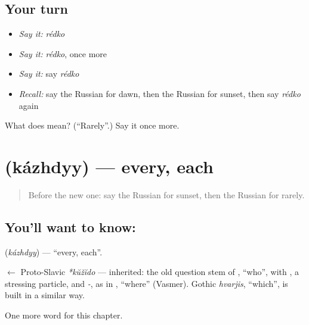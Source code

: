 \subsection*{Your turn}
\begin{itemize}
\raggedright
  \item \emph{Say it:} \emph{rédko}
  \item \emph{Say it:} \emph{rédko}, once more
  \item \emph{Say it:} say \emph{rédko}
  \item \emph{Recall:} say the Russian for dawn, then the Russian for sunset, then say \emph{rédko} again
\end{itemize}

\begin{tcolorbox}[breakable,colback=teal!4,colframe=teal!35!black,title={Before you move on}]
What does  mean? (\textquotedblleft{}Rarely\textquotedblright{}.) Say it once more.
\end{tcolorbox}
\section[\texorpdfstring{\ru{каждый} (kázhdyy)}{каждый (kázhdyy)}]{ (kázhdyy) — every, each}

\label{lesson:RU-C150-kazhdyy}



\begin{quote}
Before the new one: say the Russian for sunset, then the Russian for rarely.
\end{quote}

\subsection*{You'll want to know: }
\textbf{} (\emph{kázhdyy}) — \textquotedblleft{}every, each\textquotedblright{}.

\begin{cousinweb}
\textbf{} $\leftarrow$ Proto-Slavic \emph{*kŭžĭdo} — inherited: the old question stem of \emph{}, \textquotedblleft{}who\textquotedblright{}, with \emph{}, a stressing particle, and \emph{-}, as in \emph{}, \textquotedblleft{}where\textquotedblright{} (Vasmer). Gothic \emph{hvarjis}, \textquotedblleft{}which\textquotedblright{}, is built in a similar way.
\end{cousinweb}

\begin{grammarlens}[title={What you've built}]
One more word for this chapter.
\end{grammarlens}

